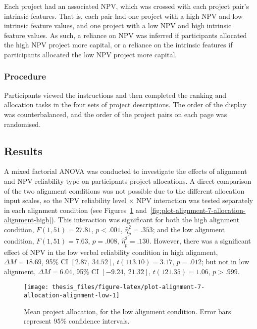 \documentclass[a4paper, nobind]{templates/ociamthesis}
\theoremstyle{definition}
\theoremstyle{definition}
\theoremstyle{definition}
\theoremstyle{definition}
\theoremstyle{remark}
\begin{document}
Each project had an associated NPV, which was crossed with each project pair's
intrinsic features. That is, each pair had one project with a high NPV and low
intrinsic feature values, and one project with a low NPV and high intrinsic
feature values. As such, a reliance on NPV was inferred if participants
allocated the high NPV project more capital, or a reliance on the intrinsic
features if participants allocated the low NPV project more capital.

\subsubsection{Procedure}

Participants viewed the instructions and then completed the ranking and
allocation tasks in the four sets of project descriptions. The order of the
display was counterbalanced, and the order of the project pairs on each page was
randomised.

\subsection{Results}

A mixed factorial ANOVA was conducted to investigate the effects of alignment
and NPV reliability type on participants project allocations. A direct
comparison of the two alignment conditions was not possible due to the different
allocation input scales, so the NPV reliability level \(\times\) NPV
interaction was tested separately in each alignment condition (see
Figures~\ref{fig:plot-alignment-7-allocation-alignment-low}
and~\ref{fig:plot-alignment-7-allocation-alignment-high}). This interaction was
significant for both the high alignment condition,
\(F(1, 51) = 27.81\), \(p < .001\), \(\hat{\eta}^2_p = .353\);
and the low alignment condition,
\(F(1, 51) = 7.63\), \(p = .008\), \(\hat{\eta}^2_p = .130\).
However, there was a significant effect of NPV in the low verbal reliability
condition in high alignment,
\(\Delta M = 18.69\), 95\% CI \([2.87,~34.52]\), \(t(113.10) = 3.17\), \(p = .012\); but not in
low alignment,
\(\Delta M = 6.04\), 95\% CI \([-9.24,~21.32]\), \(t(121.35) = 1.06\), \(p > .999\).



\begin{figure}
\texttt{[image: thesis\_files/figure-latex/plot-alignment-7-allocation-alignment-low-1]} \caption{Mean project allocation, for the low alignment condition. Error bars represent 95\% confidence intervals.}\label{fig:plot-alignment-7-allocation-alignment-low}
\end{figure}
\end{document}
